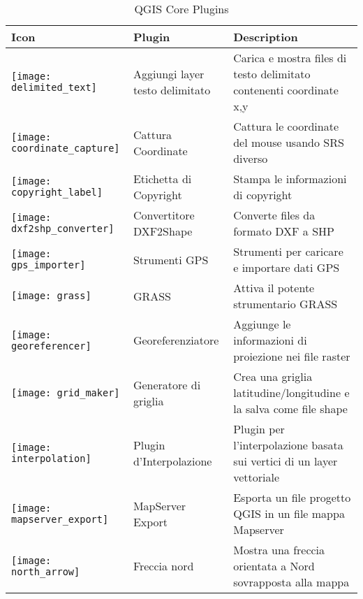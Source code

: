 \begin{minipage}{\textwidth}
\begin{table}[H]
\centering
\caption{QGIS Core Plugins}\label{tab:core_plugins}\medskip
\small
 \begin{tabular}{|l|l|p{4in}|}
\hline \textbf{Icon} & \textbf{Plugin} & \textbf{Description}\\
\hline
\texttt{[image: delimited\_text]}
 & Aggiungi layer testo delimitato \index{plugins!delimited text} & Carica e mostra files di testo delimitato contenenti coordinate x,y\\
\hline
\texttt{[image: coordinate\_capture]}
 & Cattura Coordinate \index{plugins!coordinate capture}& Cattura le coordinate del mouse
usando SRS diverso\\
\hline 
\texttt{[image: copyright\_label]}
 & Etichetta di Copyright \index{plugins!copyright}& Stampa le informazioni di copyright\\
\hline 
\texttt{[image: dxf2shp\_converter]}
 & Convertitore DXF2Shape \index{plugins!DXF2Shape}& Converte files da formato DXF a SHP\\
\hline
\texttt{[image: gps\_importer]}
 & Strumenti GPS \index{plugins!gps}& Strumenti per caricare e importare dati GPS\\
\hline
\texttt{[image: grass]}
 & GRASS \index{plugin!grass toolbox} & Attiva il potente strumentario GRASS\\
\hline
\texttt{[image: georeferencer]}
 & Georeferenziatore \index{plugin!georeferencer} & Aggiunge le informazioni di proiezione nei file raster\\
\hline
\texttt{[image: grid\_maker]}
 & Generatore di griglia \index{plugins!graticule}& Crea una griglia latitudine/longitudine e la salva come file shape\\
\hline
\texttt{[image: interpolation]}
& Plugin d'Interpolazione \index{plugins!Interpolation}& Plugin per l'interpolazione basata sui vertici di un layer vettoriale\\
\hline
\texttt{[image: mapserver\_export]}
& MapServer Export \index{plugins!MapServer Export}& Esporta un file progetto QGIS in un file mappa Mapserver\\
\hline
\texttt{[image: north\_arrow]}
& Freccia nord \index{plugins!north arrow}& Mostra una freccia orientata a Nord sovrapposta alla mappa\\

\end{tabular}
\end{table}
\end{minipage}
